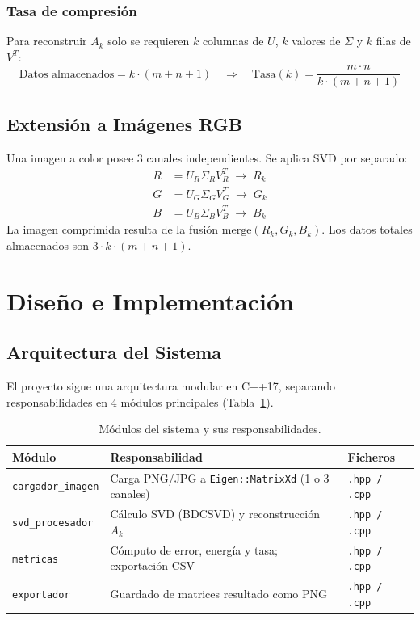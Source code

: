 ﻿\documentclass[12pt,a4paper]{article}
\theoremstyle{definition}
\begin{document}
\subsubsection{Tasa de compresi\'{o}n}
Para reconstruir $A_k$ solo se requieren $k$ columnas de $U$, $k$ valores de $\Sigma$ y $k$ filas de $V^T$:
\begin{equation}\label{eq:compresion}
\text{Datos almacenados} = k \cdot (m + n + 1) \quad \Rightarrow \quad
\text{Tasa}(k) = \frac{m \cdot n}{k \cdot (m + n + 1)}
\end{equation}

\subsection{Extensi\'{o}n a Im\'{a}genes RGB}

Una imagen a color posee 3 canales independientes. Se aplica SVD por separado:
\begin{equation}\label{eq:rgb}
\begin{aligned}
R &= U_R \Sigma_R V_R^T \;\rightarrow\; R_k \\
G &= U_G \Sigma_G V_G^T \;\rightarrow\; G_k \\
B &= U_B \Sigma_B V_B^T \;\rightarrow\; B_k
\end{aligned}
\end{equation}
La imagen comprimida resulta de la fusi\'{o}n $\text{merge}(R_k, G_k, B_k)$. Los datos totales almacenados son $3 \cdot k \cdot (m + n + 1)$.

\section{Dise\~{n}o e Implementaci\'{o}n}\label{sec:implementacion}

\subsection{Arquitectura del Sistema}

El proyecto sigue una arquitectura modular en C++17, separando responsabilidades en 4 m\'{o}dulos principales (Tabla~\ref{tab:modulos}).

\begin{table}[H]
\centering
\caption{M\'{o}dulos del sistema y sus responsabilidades.}
\label{tab:modulos}
\begin{tabular}{@{}lp{6cm}l@{}}
\toprule
\textbf{M\'{o}dulo} & \textbf{Responsabilidad} & \textbf{Ficheros} \\
\midrule
\texttt{cargador\_imagen} & Carga PNG/JPG a \texttt{Eigen::MatrixXd} (1 o 3 canales) & \texttt{.hpp / .cpp} \\
\texttt{svd\_procesador} & C\'{a}lculo SVD (BDCSVD) y reconstrucci\'{o}n $A_k$ & \texttt{.hpp / .cpp} \\
\texttt{metricas} & C\'{o}mputo de error, energ\'{i}a y tasa; exportaci\'{o}n CSV & \texttt{.hpp / .cpp} \\
\texttt{exportador} & Guardado de matrices resultado como PNG & \texttt{.hpp / .cpp} \\
\bottomrule
\end{tabular}
\end{table}
\end{document}
